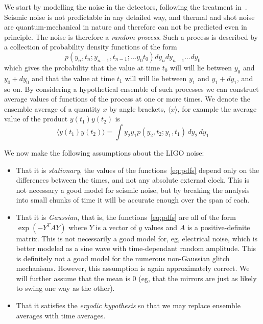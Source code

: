 We start by modelling the noise in the detectors, following the
treatment in~\cite{BlandfordThorne}.  Seismic noise is not predictable
in any detailed way, and thermal and shot noise are quantum-mechanical
in nature and therefore can not be predicted even in principle.  The
noise is therefore a \emph{random process}.  Such a process is
described by a collection of probability density functions of the form
%
\begin{equation*}
\label{eq:pdfs}
p(y_n, t_n; y_{n-1}, t_{n-1}; \ldots y_0 t_0) dy_n dy_{n-1} \ldots
dy_0
\end{equation*}
%
which gives the probability that the value at time $t_0$ will will
lie between $y_0$ and $y_0 + dy_0$ and that the value at time $t_1$
will will lie between $y_1$ and $y_1 + dy_1$, and so on.
By considering a hypothetical ensemble of such processes we can
construct average values of functions of the process at one or more
times.  We denote the ensemble average of a quantity $x$ by angle
brackets, $\langle x \rangle$, for example the average value of the product
$y(t_1)y(t_2)$ is
%
\begin{equation*}
\langle y(t_1) y(t_2) \rangle = \int y_2 y_1
p(y_2, t_2; y_1, t_1)\, dy_2\, dy_1
\end{equation*}

We now make the following assumptions about the LIGO noise:
%
\begin{itemize}
\item That it is \emph{stationary}, the values of the
functions~\ref{eq:pdfs} depend only on the differences between the
times, and not any absolute external clock.  This is not necessary a
good model for seismic noise, but by breaking the analysis into small
chunks of time it will be accurate enough over the span of each.

\item That it is \emph{Gaussian}, that is, the functions~\ref{eq:pdfs}
are all of the form $\exp(-Y^T A Y)$ where $Y$ is a vector of $y$
values and  $A$ is a positive-definite matrix.  This is not
necessarily a good model for, eg, electrical noise, which is better
modeled as a sine wave with time-dependant random amplitude.  This is
definitely not a good model for the numerous non-Gaussian glitch
mechanisms.  However, this assumption is again approximately correct.  We
will further assume that the mean is 0 (eg, that the mirrors are just
as likely to swing one way as the other).

\item That it satisfies the \emph{ergodic hypothesis} so that we may
replace ensemble averages with time averages.

\end{itemize}

